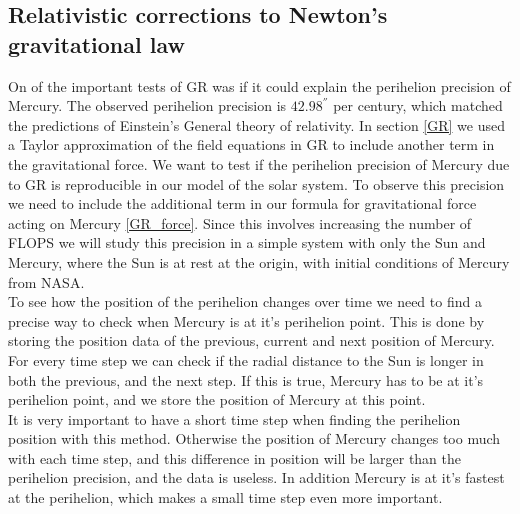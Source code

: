 \documentclass[%
 reprint,
nofootinbib,
aps,
]{revtex4-1}
\begin{document}
\subsection{Relativistic corrections to Newton's gravitational law}
On of the important tests of GR was if it could explain the perihelion precision of Mercury. The observed perihelion precision is $42.98^{''}$ per century, which matched the predictions of Einstein's General theory of relativity. In section \ref{GR} we used a Taylor approximation of the field equations in GR to include another term in the gravitational force.
We want to test if the perihelion precision of Mercury due to GR is reproducible in our model of the solar system. To observe this precision we need to include the additional term in our formula for gravitational force acting on Mercury \eqref{GR_force}. Since this involves increasing the number of FLOPS we will study this precision in a simple system with only the Sun and Mercury, where the Sun is at rest at the origin, with initial conditions of Mercury from NASA.\\
To see how the position of the perihelion changes over time we need to find a precise way to check when Mercury is at it's perihelion point. This is done by storing the position data of the previous, current and next position of Mercury. For every time step we can check if the radial distance to the Sun is longer in both the previous, and the next step. If this is true, Mercury has to be at it's perihelion point, and we store the position of Mercury at this point.\\It is very important to have a short time step when finding the perihelion position with this method. Otherwise the position of Mercury changes too much with each time step, and this difference in position will be larger than the perihelion precision, and the data is useless. In addition Mercury is at it's fastest at the perihelion, which makes a small time step even more important.
\end{document}
